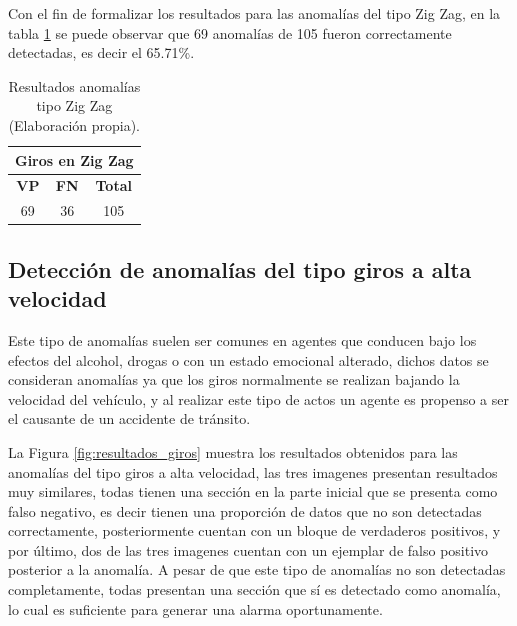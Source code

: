 Con el fin de formalizar los resultados para las anomal\'{i}as del tipo Zig Zag, en la tabla \ref{table:zigzag_resultado} se puede observar que 69 anomal\'{i}as de 105 fueron correctamente detectadas, es decir el 65.71\%. 

\begin{table}[H]
\centering
\begin{center}
\begin{tabular}{|c|c|c|}
\hline
\multicolumn{3}{|l|}{\textbf{Giros en Zig Zag}} \\ \hline
\textbf{VP}   & \textbf{FN}   & \textbf{Total}  \\ \hline
\cellcolor[HTML]{AADD99}69  & \cellcolor[HTML]{DF9F9F}36  & 105             \\ \hline
\end{tabular}
\caption{Resultados anomal\'{i}as tipo Zig Zag (Elaboraci\'{o}n propia).}
\label{table:zigzag_resultado}
\end{center}
\end{table}

\subsection{Detecci\'{o}n de anomal\'{i}as del tipo giros a alta velocidad}

Este tipo de anomal\'{i}as suelen ser comunes en agentes que conducen bajo los efectos del alcohol, drogas o con un estado emocional alterado, dichos datos se consideran anomal\'{i}as ya que los giros normalmente se realizan bajando la velocidad del veh\'{i}culo, y al realizar este tipo de actos un agente es propenso a ser el causante de un accidente de tr\'{a}nsito.

\vspace{5mm} %

La Figura \ref{fig:resultados_giros} muestra los resultados obtenidos para las anomal\'{i}as del tipo giros a alta velocidad, las tres imagenes presentan resultados muy similares, todas tienen una secci\'{o}n en la parte inicial que se presenta como falso negativo, es decir tienen una proporci\'{o}n de datos que no son detectadas correctamente, posteriormente cuentan con un bloque de verdaderos positivos, y por \'{u}ltimo, dos de las tres imagenes cuentan con un ejemplar de falso positivo posterior a la anomal\'{i}a. A pesar de que este tipo de anomal\'{i}as no son detectadas completamente, todas presentan una secci\'{o}n que s\'{i} es detectado como anomal\'{i}a, lo cual es suficiente para generar una alarma oportunamente.

